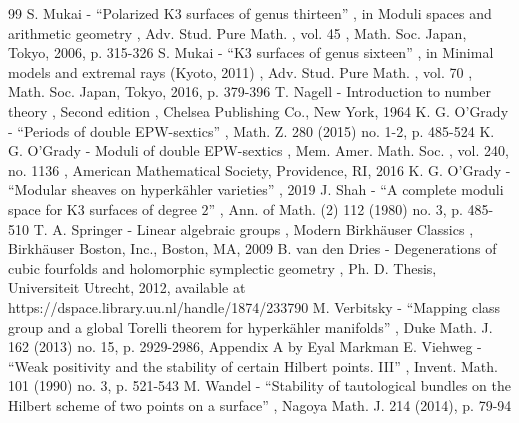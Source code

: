 \documentclass[11pt]{article}
\theoremstyle{definition}
\begin{document}
\begin{thebibliography}{99}
 S. Mukai - “Polarized K3 surfaces of genus thirteen” , in Moduli spaces and arithmetic geometry , Adv. Stud. Pure Math. , vol. 45 , Math. Soc. Japan, Tokyo, 2006, p. 315-326
 S. Mukai - “K3 surfaces of genus sixteen” , in Minimal models and extremal rays (Kyoto, 2011) , Adv. Stud. Pure Math. , vol. 70 , Math. Soc. Japan, Tokyo, 2016, p. 379-396
 T. Nagell - Introduction to number theory , Second edition , Chelsea Publishing Co., New York, 1964
 K. G. O’Grady - “Periods of double EPW-sextics” , Math. Z. 280 (2015) no. 1-2, p. 485-524
 K. G. O’Grady - Moduli of double EPW-sextics , Mem. Amer. Math. Soc. , vol. 240, no. 1136 , American Mathematical Society, Providence, RI, 2016
 K. G. O’Grady - “Modular sheaves on hyperkähler varieties” , 2019
 J. Shah - “A complete moduli space for K3 surfaces of degree $2$” , Ann. of Math. (2) 112 (1980) no. 3, p. 485-510
 T. A. Springer - Linear algebraic groups , Modern Birkhäuser Classics , Birkhäuser Boston, Inc., Boston, MA, 2009
 B. van den Dries - Degenerations of cubic fourfolds and holomorphic symplectic geometry , Ph. D. Thesis, Universiteit Utrecht, 2012, available at https://dspace.library.uu.nl/handle/1874/233790
 M. Verbitsky - “Mapping class group and a global Torelli theorem for hyperkähler manifolds” , Duke Math. J. 162 (2013) no. 15, p. 2929-2986, Appendix A by Eyal Markman
 E. Viehweg - “Weak positivity and the stability of certain Hilbert points. III” , Invent. Math. 101 (1990) no. 3, p. 521-543
 M. Wandel - “Stability of tautological bundles on the Hilbert scheme of two points on a surface” , Nagoya Math. J. 214 (2014), p. 79-94
\end{thebibliography}
\end{document}
